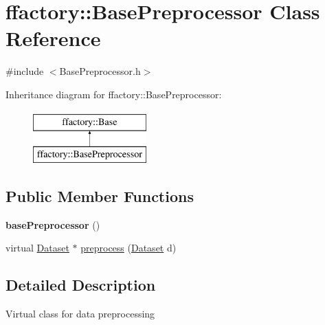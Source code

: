 \hypertarget{classffactory_1_1_base_preprocessor}{\section{ffactory\-:\-:Base\-Preprocessor Class Reference}
\label{classffactory_1_1_base_preprocessor}
}


{\ttfamily \#include $<$Base\-Preprocessor.\-h$>$}

Inheritance diagram for ffactory\-:\-:Base\-Preprocessor\-:\begin{figure}[H]
\begin{center}
\leavevmode
\includegraphics[height=2.000000cm]{classffactory_1_1_base_preprocessor}
\end{center}
\end{figure}
\subsection*{Public Member Functions}
\begin{DoxyCompactItemize}
\item 
\hypertarget{classffactory_1_1_base_preprocessor_aba9d0e28cb40fa8e7fce41cf97ddaf98}{{\bfseries base\-Preprocessor} ()}\label{classffactory_1_1_base_preprocessor_aba9d0e28cb40fa8e7fce41cf97ddaf98}

\item 
virtual \hyperlink{classffactory_1_1_dataset}{Dataset} $\ast$ \hyperlink{classffactory_1_1_base_preprocessor_add6380a587d34d4bf295f85056abaddd}{preprocess} (\hyperlink{classffactory_1_1_dataset}{Dataset} d)
\end{DoxyCompactItemize}


\subsection{Detailed Description}
Virtual class for data preprocessing 

